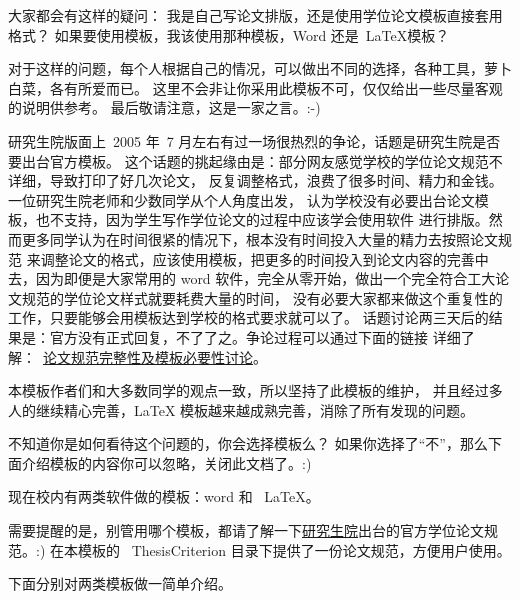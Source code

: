 

\label{Tricks}

\label{tricks:abouttemplates}

大家都会有这样的疑问：
我是自己写论文排版，还是使用学位论文模板直接套用格式？
如果要使用模板，我该使用那种模板，Word 还是~\LaTeX 模板？

对于这样的问题，每个人根据自己的情况，可以做出不同的选择，各种工具，萝卜白菜，各有所爱而已。
这里不会非让你采用此模板不可，仅仅给出一些尽量客观的说明供参考。
最后敬请注意，这是一家之言。:-)

\label{tricks:necessaryornot}

研究生院版面上~2005 年~7 月左右有过一场很热烈的争论，话题是研究生院是否要出台官方模板。
这个话题的挑起缘由是：部分网友感觉学校的学位论文规范不详细，导致打印了好几次论文，
反复调整格式，浪费了很多时间、精力和金钱。一位研究生院老师和少数同学从个人角度出发，
认为学校没有必要出台论文模板，也不支持，因为学生写作学位论文的过程中应该学会使用软件
进行排版。然而更多同学认为在时间很紧的情况下，根本没有时间投入大量的精力去按照论文规范
来调整论文的格式，应该使用模板，把更多的时间投入到论文内容的完善中去，因为即便是大家常用的 word 软件，完全从零开始，做出一个完全符合工大论文规范的学位论文样式就要耗费大量的时间，
没有必要大家都来做这个重复性的工作，只要能够会用模板达到学校的格式要求就可以了。
话题讨论两三天后的结果是：官方没有正式回复，不了了之。争论过程可以通过下面的链接
详细了解：~\href{http://bbs.hit.edu.cn/cgi-bin/bbs/bbs0an?path=\%2Fgroups\%2FGROUP\%5F6\%2FTeX\%2Ftex05\%2Fabout}{论文规范完整性及模板必要性讨论}。

本模板作者们和大多数同学的观点一致，所以坚持了此模板的维护，
并且经过多人的继续精心完善，LaTeX 模板越来越成熟完善，消除了所有发现的问题。

不知道你是如何看待这个问题的，你会选择模板么？ 如果你选择了``不''，那么下面介绍模板的内容你可以忽略，关闭此文档了。:)

现在校内有两类软件做的模板：word 和~ LaTeX。

需要提醒的是，别管用哪个模板，都请了解一下\href{http://hitgs.hit.edu.cn/}{研究生院}出台的官方学位论文规范。:)
在本模板的~ ThesisCriterion 目录下提供了一份论文规范，方便用户使用。

下面分别对两类模板做一简单介绍。

